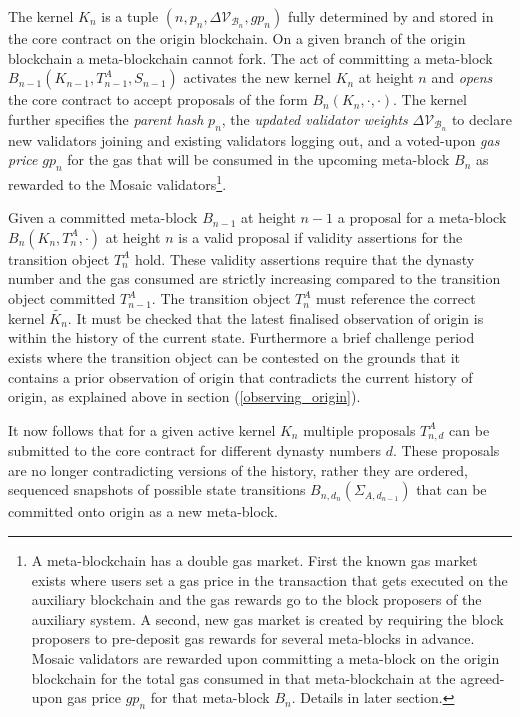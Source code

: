 \documentclass[12pt,a4paper]{article}
\begin{document}
The kernel $K_n$ is a tuple $(n, p_n, \Delta\mathcal{V}_{\mathcal{B}_n}, gp_n)$ fully determined by and stored in the core contract on the origin blockchain. %
On a given branch of the origin blockchain a meta-blockchain cannot fork. The act of committing a meta-block $B_{n-1}(K_{n-1}, T^A_{n-1}, S_{n-1})$ activates the new kernel $K_n$ at height $n$ and \emph{opens} the core contract to accept proposals of the form $B_n(K_n, \cdot, \cdot)$. The kernel further specifies the \emph{parent hash} $p_n$, the \emph{updated validator weights} $\Delta\mathcal{V}_{\mathcal{B}_n}$ to declare new validators joining and existing validators logging out, and a voted-upon \emph{gas price} $gp_n$ for the gas that will be consumed in the upcoming meta-block $B_n$ as rewarded to the Mosaic validators\footnote{A meta-blockchain has a double gas market. First the known gas market exists where users set a gas price in the transaction that gets executed on the auxiliary blockchain and the gas rewards go to the block proposers of the auxiliary system.  A second, new gas market is created by requiring the block proposers to pre-deposit gas rewards for several meta-blocks in advance.  Mosaic validators are rewarded upon committing a meta-block on the origin blockchain for the total gas consumed in that meta-blockchain at the agreed-upon gas price $gp_n$ for that meta-block $B_n$.  Details in later section.}.

Given a committed meta-block $B_{n-1}$ at height $n-1$ a proposal for a meta-block $B_{n}(K_{n}, T^A_{n}, \cdot)$ at height $n$ is a valid proposal if validity assertions for the transition object $T^A_n$ hold.  These validity assertions require that the dynasty number and the gas consumed are strictly increasing compared to the transition object committed $T^A_{n-1}$. The transition object $T^A_n$ must reference the correct kernel $\tilde{K_n}$. It must be checked that the latest finalised observation of origin is within the history of the current state. Furthermore  a brief challenge period exists where the transition object can be contested on the grounds that it contains a prior observation of origin that contradicts the current history of origin, as explained above in section (\ref{observing_origin}).

It now follows that for a given active kernel $K_n$ multiple proposals $T^{A}_{n,d}$ can be submitted to the core contract for different dynasty numbers $d$.  These proposals are no longer contradicting versions of the history, rather they are ordered, sequenced snapshots of possible state transitions $B_{n,d_{n}}(\Sigma_{A,d_{n-1}})$ that can be committed onto origin as a new meta-block.
\end{document}
